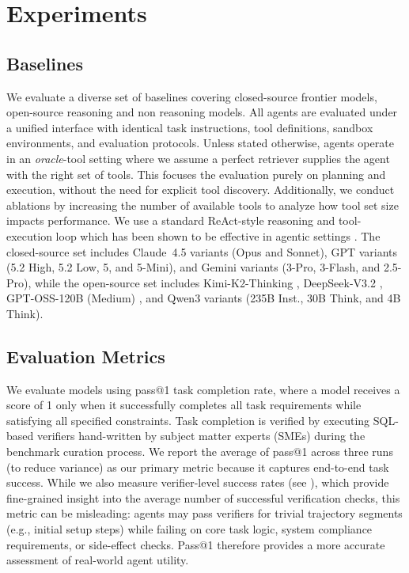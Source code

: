 \section{Experiments}



\subsection{Baselines}
\label{subsec:baselines}

We evaluate a diverse set of baselines covering closed-source frontier models, open-source reasoning and non reasoning models. All agents are evaluated under a unified interface with identical task instructions, tool definitions, sandbox environments, and evaluation protocols. Unless stated otherwise, agents operate in an \textit{oracle}-tool setting where we assume a perfect retriever supplies the agent with the right set of tools. This focuses the evaluation purely on planning and execution, without the need for explicit tool discovery. Additionally, we conduct ablations by increasing the number of available tools to analyze how tool set size impacts performance. We use a standard ReAct-style reasoning and tool-execution loop which has been shown to be effective in agentic settings \cite{yao2022react}. The closed-source set includes Claude~4.5 \citep{anthropic2025sonnet45, anthropic2025opus45} variants (Opus and Sonnet), GPT \citep{openai2025gpt5} variants (5.2 High, 5.2 Low, 5, and 5-Mini), and Gemini \citep{comanici2025gemini25pushingfrontier} variants (3-Pro, 3-Flash, and 2.5-Pro), while the open-source set includes Kimi-K2-Thinking \citep{kimiteam2025kimik2openagentic}, DeepSeek-V3.2 \citep{deepseekai2024deepseekv3technicalreport}, GPT-OSS-120B (Medium) \citep{openai2025gptoss120bgptoss20bmodel}, and Qwen3 \citep{qwen3} variants (235B Inst., 30B Think, and 4B Think).

\subsection{Evaluation Metrics}
We evaluate models using pass@1 task completion rate, where a model receives a score of 1 only when it successfully completes all task requirements while satisfying all specified constraints. Task completion is verified by executing SQL-based verifiers hand-written by subject matter experts (SMEs) during the benchmark curation process.
We report the average of pass@1 across three runs (to reduce variance) as our primary metric because it captures end-to-end task success. While we also measure verifier-level success rates (see ), which provide fine-grained insight into the average number of successful verification checks, this metric can be misleading: agents may pass verifiers for trivial trajectory segments (e.g., initial setup steps) while failing on core task logic, system compliance requirements, or side-effect checks. Pass@1 therefore provides a more accurate assessment of real-world agent utility.


